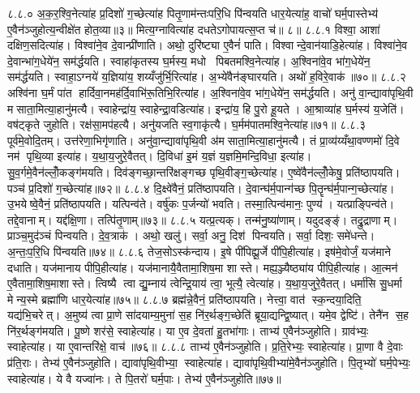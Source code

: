 ८.८.०
अ॒क॒र॒श्वि॒नेत्या॑ह प्र॒दिशो॑ ग॒च्छेत्या॑ह पितृ॒णाम॑न्तःपरि॒धि पि॑न्वयति धार॒येत्या॑ह॒ वाचो॑ घर्म॒पास्तेभ्य॑ ए॒वैन॑ञ्जुहोत्य॒न्वीक्षे॑त होत॒व्या॥३॥ मित्य॒ग्नावित्या॑ह दधतेऽगोपायत्स॒प्त च॑॥ ८॥
८.८.१
विश्वा॒ आशा॑ दक्षिण॒सदित्या॑ह। विश्वा॑ने॒व दे॒वान्प्री॑णाति। अथो॒ दुरि॑ष्ट्या ए॒वैनं॑ पाति। विश्वान्दे॒वान॑याडि॒हेत्या॑ह। विश्वा॑ने॒व दे॒वान्भा॑ग॒धेये॑न॒ सम॑र्द्धयति। स्वाहा॑कृतस्य घ॒र्मस्य॒ मधो पिबतमश्वि॒नेत्या॑ह। अ॒श्विना॑वे॒व भा॑ग॒धेये॑न॒ सम॑र्द्धयति। स्वाहा॒ऽग्नये॑ य॒ज्ञिया॑य॒ शय्यँजु॑र्भि॒रित्या॑ह। अ॒भ्ये॑वैन॑ङ्घारयति। अथो॑ ह॒विरे॒वाक॑॥७०॥
८.८.२
अश्वि॑ना घ॒र्मं पा॑त हार्दिवा॒नमह॑र्दि॒वाभि॑रू॒तिभि॒रित्या॑ह। अ॒श्विना॑वे॒व भा॑ग॒धेये॑न॒ सम॑र्द्धयति। अनु॑ वा॒न्द्यावा॑पृथि॒वी मसाता॒मित्या॒हानु॑मत्यै। स्वाहेन्द्रा॑य॒ स्वाहेन्द्रा॒वडित्या॑ह। इन्द्रा॑य॒ हि पु॒रो हू॒यते। आ॒श्राव्या॑ह घ॒र्मस्य॑ य॒जेति॑। वष॑ट्कृते जुहोति। रक्ष॑सा॒मप॑हत्यै। अनु॑यजति स्व॒गाकृ॑त्यै। घ॒र्मम॑पातमश्वि॒नेत्या॑ह॥७१॥
८.८.३
पूर्व॑मे॒वोदि॒तम्। उत्त॑रेणा॒भिगृ॑णाति। अनु॑वा॒न्द्यावा॑पृथि॒वी अ॑मसाता॒मित्या॒हानु॑मत्यै। तं प्रा॒व्य॑य्यँथा॒वण्णमो॑ दि॒वे नम॑ पृथि॒व्या इत्या॑ह। य॒था॒य॒जुरे॒वैतत्। दि॒विधा॑ इ॒मं य॒ज्ञं य॒ज्ञमि॒मन्दि॒विधा॒ इत्या॑ह। सु॒व॒र्गमे॒वैन॑ल्लोँ॒कङ्ग॑मयति। दिव॑ङ्गच्छा॒न्तरि॑क्षङ्गच्छ पृथि॒वीङ्ग॒च्छेत्या॑ह। ए॒ष्वे॑वैन॑ल्लोँ॒केषु॒ प्रति॑ष्ठापयति। पञ्च॑ प्र॒दिशो॑ ग॒च्छेत्या॑ह॥७२॥
८.८.४
दि॒क्ष्वे॑वैनं॒ प्रति॑ष्ठापयति। दे॒वान्घ॑र्म॒पान्ग॑च्छ पि॒तॄन्घ॑र्म॒पान्ग॒च्छेत्या॑ह। उ॒भयेष्वे॒वैनं॒ प्रति॑ष्ठापयति। यत्पिन्व॑ते। वर्\mbox{}षु॑कः प॒र्जन्यो॑ भवति। तस्मा॒त्पिन्व॑मानः॒ पुण्य॑। यत्प्राङ्पिन्व॑ते। तद्दे॒वानाम्। यद्द॑क्षि॒णा। तत्पि॑तृ॒णाम्॥७३॥
८.८.५
यत्प्र॒त्यक्। तन्म॑नु॒ष्या॑णाम्। यदुदङ्ङ्॑। तद्रु॒द्राणाम्। प्राञ्च॒मुद॑ञ्चं पिन्वयति। दे॒व॒त्राक॑। अथो॒ खलु॑। सर्वा॒ अनु॒ दिश॑ पिन्वयति। सर्वा॒ दिशः॒ समे॑धन्ते। अ॒न्तः॒प॒रि॒धि पि॑न्वयति॥७४॥
८.८.६
तेज॒सोऽस्क॑न्दाय। इ॒षे पी॑पिह्यू॒र्जे पी॑पि॒हीत्या॑ह। इष॑मे॒वोर्जं॒ यज॑माने दधाति। यज॑मानाय पीपि॒हीत्या॑ह। यज॑मानायै॒वैतामा॒शिष॒मा शास्ते। मह्य॒ञ्ज्यैष्ठ्या॑य पीपि॒हीत्या॑ह। आ॒त्मन॑ ए॒वैतामा॒शिष॒माशास्ते। त्विष्यै त्वा द्यु॒म्नाय॑ त्वेन्द्रि॒याय॑ त्वा॒ भूत्यै॒ त्वेत्या॑ह। य॒था॒य॒जुरे॒वैतत्। धर्मा॑सि सु॒धर्मा मेन्य॒स्मे ब्रह्मा॑णि धार॒येत्या॑ह॥७५॥
८.८.७
ब्रह्म॑न्ने॒वैनं॒ प्रति॑ष्ठापयति। नेत्त्वा॒ वात॑ स्क॒न्दया॒दिति॒ यद्य॑भि॒चरेत्। अ॒मुष्य॑ त्वा प्रा॒णे सा॑दयाम्य॒मुना॑ स॒ह नि॑र॒र्थङ्ग॒च्छेति॑ ब्रूया॒द्यन्द्वि॒ष्यात्। यमे॒व द्वेष्टि॑। तेनै॑न स॒ह नि॑र॒र्थङ्ग॑मयति। पू॒ष्णे शर॑से॒ स्वाहेत्या॑ह। या ए॒व दे॒वता॑ हु॒तभा॑गाः। ताभ्य॑ ए॒वैन॑ञ्जुहोति। ग्राव॑भ्यः॒ स्वाहेत्या॑ह। या ए॒वान्तरि॑क्षे॒ वाच॑॥७६॥
८.८.८
ताभ्य॑ ए॒वैन॑ञ्जुहोति। प्र॒ति॒रेभ्यः॒ स्वाहेत्या॑ह। प्रा॒णा वै दे॒वाः प्र॑ति॒राः। तेभ्य॑ ए॒वैन॑ञ्जुहोति। द्यावा॑पृथि॒वीभ्या॒ स्वाहेत्या॑ह। द्यावा॑पृथि॒वीभ्या॑मे॒वैन॑ञ्जुहोति। पि॒तृभ्यो॑ घर्म॒पेभ्यः॒ स्वाहेत्या॑ह। ये वै यज्वा॑नः। ते पि॒तरो॑ घर्म॒पाः। तेभ्य॑ ए॒वैन॑ञ्जुहोति॥७७॥
